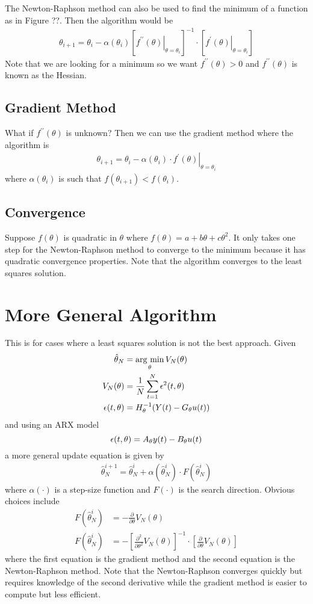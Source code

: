 The Newton-Raphson method can also be used to find the minimum of a function as in Figure ??. Then the algorithm would be
\begin{align*}
\boxed{\theta_{i+1} = \theta_i - \alpha(\theta_i)\left[\left.f^{\prime\prime}(\theta)\right|_{\theta=\theta_i}\right]^{-1}\cdot\left[\left.f^\prime(\theta)\right|_{\theta=\theta_i}\right]}
\end{align*}
Note that we are looking for a minimum so we want $f^{\prime\prime}(\theta)>0$ and $f^{\prime\prime}(\theta)$ is known as the Hessian.

\subsection{Gradient Method}
What if $f^{\prime\prime}(\theta)$ is unknown? Then we can use the gradient method where the algorithm is
\begin{align*}
\boxed{\theta_{i+1} = \theta_i - \alpha(\theta_i)\cdot \left.f^\prime(\theta)\right|_{\theta=\theta_i}}
\end{align*}
where $\alpha(\theta_i)$ is such that $f(\theta_{i+1})<f(\theta_i)$.

\subsection{Convergence}
Suppose $f(\theta)$ is quadratic in $\theta$ where $f(\theta)=a+b\theta+c\theta^2$. It only takes one step for the Newton-Raphson method to converge to the minimum because it has quadratic convergence properties. Note that the algorithm converges to the least squares solution.

\section{More General Algorithm}
This is for cases where a least squares solution is not the best approach. Given
\begin{align*}
\hat{\theta}_N &= \mathop{\arg\,\min}\limits_\theta V_N(\theta) \\
V_N(\theta) &= \frac{1}{N}\sum_{t=1}^N\epsilon^2(t,\theta) \\
\epsilon(t,\theta) &= H_\theta^{-1}(Y(t)-G_\theta u(t))
\end{align*}
and using an ARX model
$$\epsilon(t,\theta) = A_\theta y(t)-B_\theta u(t)$$
a more general update equation is given by
\begin{align*}
\boxed{\hat{\theta}_N^{i+1} = \hat{\theta}_N^i + \alpha(\hat{\theta}_N^i)\cdot F(\hat{\theta}_N^i)}
\end{align*}
where $\alpha(\cdot)$ is a step-size function and $F(\cdot)$ is the search direction. Obvious choices include
\begin{align*}
F(\hat{\theta}_N^i) &= -\frac{\partial}{\partial\theta}V_N(\theta) \\
F(\hat{\theta}_N^i) &= -\left[\frac{\partial^2}{\partial\theta^2}V_N(\theta)\right]^{-1}\cdot\left[\frac{\partial}{\partial\theta}V_N(\theta)\right]
\end{align*}
where the first equation is the gradient method and the second equation is the Newton-Raphson method. Note that the Newton-Raphson converges quickly but requires knowledge of the second derivative while the gradient method is easier to compute but less efficient.

